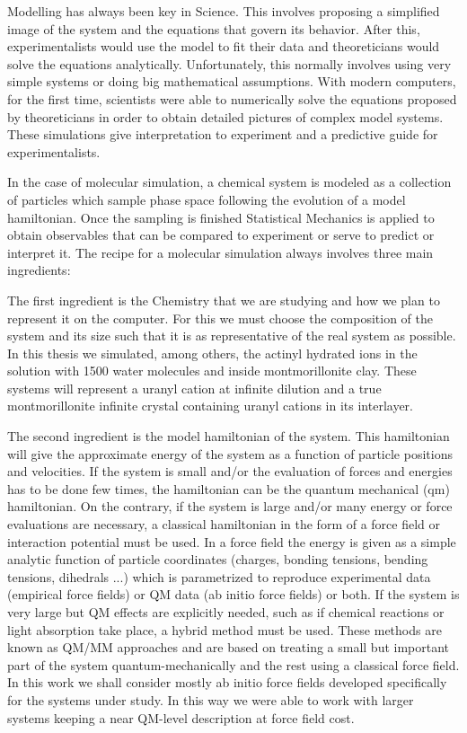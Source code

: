 Modelling has always been key in Science. This involves proposing a simplified image of the system 
and the equations that govern its behavior. After this, experimentalists would 
use the model to fit their data and theoreticians would solve the equations analytically. 
Unfortunately, this normally involves using very simple systems or doing big mathematical 
assumptions. With modern computers, for the first time, scientists were able to numerically solve 
the equations proposed by theoreticians in 
order to obtain detailed pictures of complex model systems. These simulations give 
interpretation to experiment and a predictive guide for experimentalists. 

In the case of molecular simulation, a chemical system is modeled as a collection of particles 
which sample phase space following the evolution of a model hamiltonian. Once the sampling is 
finished Statistical Mechanics is applied to obtain observables that can be compared to 
experiment or serve to predict or interpret it. The recipe for a molecular simulation always 
involves three main ingredients: 

The first ingredient is the Chemistry that we are studying and how we plan to 
represent it on the 
computer. For this we must choose the composition of the system and its size such that it is as 
representative of the real system as possible. In this thesis we simulated, among others, the 
actinyl hydrated ions in the solution with 1500 water molecules and inside montmorillonite clay. 
These systems will represent a uranyl cation at infinite dilution and a true montmorillonite 
infinite crystal containing uranyl cations in its interlayer. 

The second ingredient is the model hamiltonian of the system. This hamiltonian will give the 
approximate energy of the system as a function of particle positions and velocities. If the 
system is small and/or the evaluation of forces and energies has to be done few times, the 
hamiltonian can be the quantum mechanical (\gls{qm}) hamiltonian. On the contrary, if the system is 
large and/or many energy or force evaluations are necessary, a classical hamiltonian in the form of 
a 
force field or interaction potential must be used. In a force field the energy is given as a
simple analytic function of particle coordinates (charges, bonding tensions, bending tensions, 
dihedrals ...) which is parametrized to reproduce experimental data (empirical force fields) or 
QM data (ab initio force fields) or both. If the system is very large but  
QM effects are explicitly needed, such as if chemical reactions or light 
absorption take place, a hybrid method must be used. These methods are known as QM/MM 
approaches and 
are based on treating a small but important part of the system quantum-mechanically and the rest 
using a classical force field. In this work we shall consider mostly ab initio force fields 
developed specifically for the systems under study. In this way we were able to work with 
larger 
systems keeping a near QM-level description at force field cost.


